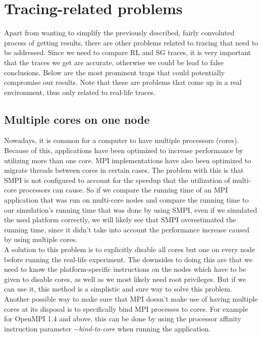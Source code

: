 \section{Tracing-related problems}
Apart from wanting to simplify the previously described, fairly
convoluted process of getting results, there are other problems
related to tracing that need to be addressed. Since we need to compare
RL and SG traces, it is very important that the traces we get are
accurate, otherwise we could be lead to false conclusions. Below are
the most prominent traps that could potentially compromise our
results. Note that these are problems that come up in a real
environment, thus only related to real-life traces.
\subsection{Multiple cores on one node}
Nowadays, it is common for a computer to have multiple processors
(cores). Because of this, applications have been optimized to increase
performance by utilizing more than one core. MPI implementations have
also been optimized to migrate threads between cores in certain
cases. The problem with this is that SMPI is not configured to account
for the speedup that the utilization of multi-core processors can
cause. So if we compare the running time of an MPI application that
was run on multi-core nodes and compare the running time to our
simulation's running time that was done by using SMPI, even if we
simulated the used platform correctly, we will likely see that SMPI
overestimated the running time, since it didn't take into account the
performance increase caused by using multiple cores.\\
A solution to this problem is to explicitly disable all cores but one
on every node before running the real-life experiment.\cite{ms11}
The downsides to doing this are that we need to know the
platform-specific
instructions on the nodes which have to be given to disable cores, as
well as we most likely need root privileges. But if we can use it,
this method is a simplistic and sure way to solve this problem.\\
Another possible way to make sure that MPI doesn't make use of having
multiple cores at its disposal is to specifically bind MPI processes
to cores. For example for OpenMPI 1.4 and above, this can be done by
using the processor affinity instruction parameter
\emph{-{}-bind-to-core} when running the application.
